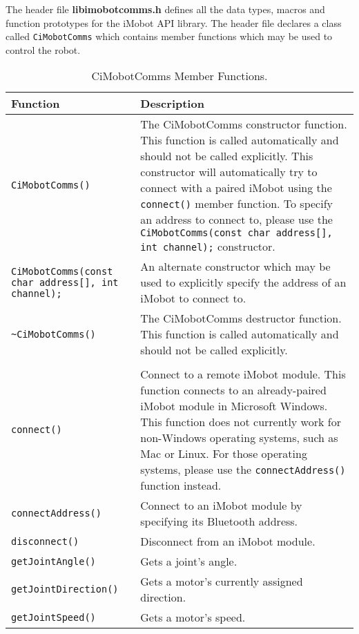 \noindent
The header file {\bf libimobotcomms.h} defines all the data types, macros 
and function prototypes for the iMobot API library. The header file
declares a class called \texttt{CiMobotComms} which contains member functions which
may be used to control the robot.

\begin{table}[!hp]
\begin{center}
\caption{CiMobotComms Member Functions.}
\begin{tabular}{p{38 mm}p{77 mm}}
\hline
Function & Description \\
\hline
\texttt{CiMobotComms()} & The CiMobotComms constructor function. This function
is called automatically and should not be called explicitly. This constructor will 
automatically try to connect with a paired iMobot using the \texttt{connect()} member
function. To specify an address to connect to, please use the
\texttt{CiMobotComms(const char address[], int channel);} constructor.\\
\texttt{CiMobotComms(const char address[], int channel);} & 
An alternate constructor which may be used to explicitly specify the address of an iMobot 
to connect to. \\
\texttt{\textasciitilde CiMobotComms()} & The CiMobotComms destructor function. This function
is called automatically and should not be called explicitly. \\
& \\
\texttt{connect()} & Connect to a remote iMobot module. This function connects to an already-paired iMobot module in Microsoft Windows. This function does not currently work for non-Windows operating systems, such as Mac or Linux. For those operating systems, please use the \texttt{connectAddress()} function instead. \\
\texttt{connectAddress()} & Connect to an iMobot module by specifying its Bluetooth address. \\
\texttt{disconnect()} & Disconnect from an iMobot module. \\
\texttt{getJointAngle()} & Gets a joint's angle. \\
\texttt{getJointDirection()} & Gets a motor's currently assigned direction. \\
\texttt{getJointSpeed()} & Gets a motor's speed. \\

\end{tabular}
\end{center}
\end{table}
